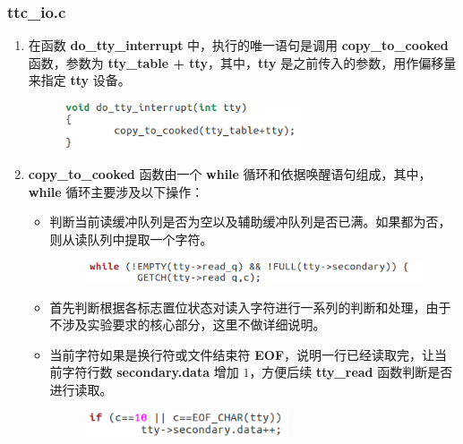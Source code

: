         \subsubsection{ttc\_io.c}
            \begin{enumerate}
                \item 在函数 \textbf{do\_tty\_interrupt} 中，执行的唯一语句是调用 \textbf{copy\_to\_cooked} 函数，参数为 \textbf{tty\_table + tty}，其中，\textbf{tty} 是之前传入的参数，用作偏移量来指定 \textbf{tty} 设备。
                    \begin{figure}[htbp]
                        \hspace*{1.5cm}
                        \includegraphics*[width = 7cm]{s1_0.png}
                    \end{figure}
                \item \textbf{copy\_to\_cooked} 函数由一个 \textbf{while} 循环和依据唤醒语句组成，其中，\textbf{while} 循环主要涉及以下操作：
                    \begin{itemize}
                        \item 判断当前读缓冲队列是否为空以及辅助缓冲队列是否已满。如果都为否，则从读队列中提取一个字符。
                            \begin{figure}[htbp]
                                \hspace*{2.3cm}
                                \includegraphics*[width = 10cm]{s1_1.png}
                            \end{figure}
                        \item 首先判断根据各标志置位状态对读入字符进行一系列的判断和处理，由于不涉及实验要求的核心部分，这里不做详细说明。
                        \item 当前字符如果是换行符或文件结束符 \textbf{EOF}，说明一行已经读取完，让当前字符行数 \textbf{secondary.data} 增加 $1$，方便后续 \textbf{tty\_read} 函数判断是否进行读取。
                            \begin{figure}[htbp]
                                \hspace*{2.3cm}
                                \includegraphics*[width = 6cm]{s1_2.png}

\end{figure}
\end{itemize}
\end{enumerate}
